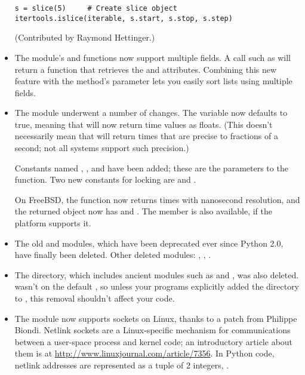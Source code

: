 \documentclass{howto}
\begin{document}
\begin{itemize}
\begin{verbatim}
s = slice(5)     # Create slice object
itertools.islice(iterable, s.start, s.stop, s.step)
\end{verbatim}

(Contributed by Raymond Hettinger.)

\item The  module's  
and  functions now support multiple fields.  
A call such as 
will return a function 
that retrieves the  and  attributes.  Combining 
this new feature with the  method's  parameter 
lets you easily sort lists using multiple fields.



\item The  module underwent a number of changes.  The
 variable now defaults to true, meaning that
 will now return time values as floats.  (This
doesn't necessarily mean that  will return times
that are precise to fractions of a second; not all systems support
such precision.)

Constants named , , and
 have been added; these are the parameters to the
 function.  Two new constants for locking are
 and .

On FreeBSD, the  function now returns 
times with nanosecond resolution, and the returned object
now has  and .
The  member is also available, if the platform supports it.

\item The old  and  modules, which have been 
deprecated ever since Python 2.0, have finally been deleted.  
Other deleted modules: , ,
.

\item The  directory,
which includes ancient modules such as  and
, was also deleted.   wasn't on the default
, so unless your programs explicitly added the directory to 
, this removal shouldn't affect your code.

\item The  module now supports 
sockets on Linux, thanks to a patch from Philippe Biondi.  
Netlink sockets are a Linux-specific mechanism for communications
between a user-space process and kernel code; an introductory 
article about them is at \url{http://www.linuxjournal.com/article/7356}.
In Python code, netlink addresses are represented as a tuple of 2 integers, 
.


\end{itemize}
\end{document}
